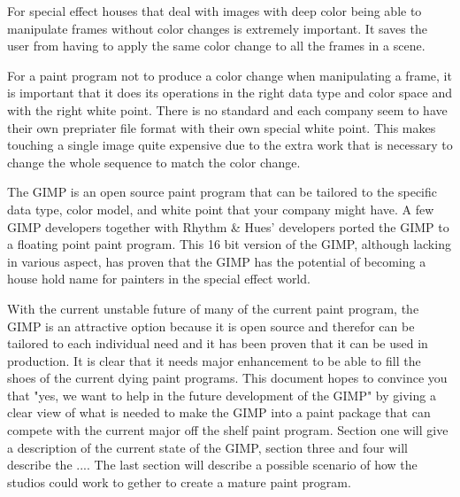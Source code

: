 For special effect houses that deal with images with deep color being able to manipulate frames without color changes is extremely important. It saves the user from having to apply the same color change to all the frames in a scene. 

For a paint program not to produce a color change when manipulating a frame, it is important that it does its operations in the right data type and color space and with the right white point. There is no standard and each company seem to have their own prepriater file format with their own special white point. This makes touching a single image quite expensive due to the extra work that is necessary to change the whole sequence to match the color change. 

The GIMP is an open source paint program that can be tailored to the specific data type, color model, and white point that your company might have. A few GIMP developers together with Rhythm \& Hues' developers ported the GIMP to a floating point paint program. This 16 bit version of the GIMP, although lacking in various aspect, has proven that the GIMP has the potential of becoming a house hold name for painters in the special effect world. 

With the current unstable future of many of the current paint program, the GIMP is an  attractive option because it is open source and therefor can be tailored to each individual need and it has been proven that it can be used in production. It is clear that it needs major enhancement to be able to fill the shoes of the current dying paint programs. This document hopes to convince you that "yes, we want to help in the future development of the GIMP" by giving a clear view of what is needed to make the GIMP into a paint package that can compete with the current major off the shelf paint program. 
Section one will give a description of the current state of the GIMP, section three and four will describe the ....
The last section will describe a possible scenario of how the studios could work to gether to create a mature paint program.


